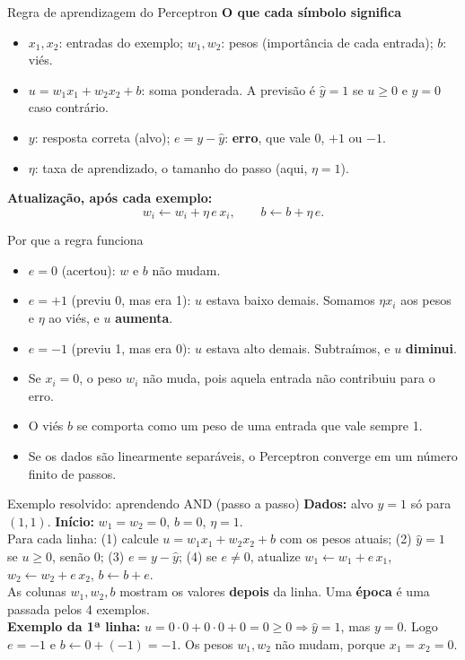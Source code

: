 \documentclass[10pt]{beamer}
\begin{document}
\begin{frame}{Regra de aprendizagem do Perceptron}
\textbf{O que cada símbolo significa}
\begin{itemize}
 \item $x_1,x_2$: entradas do exemplo; $w_1,w_2$: pesos (importância de cada entrada); $b$: viés.
 \item $u=w_1x_1+w_2x_2+b$: soma ponderada. A previsão é $\hat y=1$ se $u\ge0$ e $\hat y=0$ caso contrário.
 \item $y$: resposta correta (alvo); $e=y-\hat y$: \textbf{erro}, que vale $0$, $+1$ ou $-1$.
 \item $\eta$: taxa de aprendizado, o tamanho do passo (aqui, $\eta=1$).
\end{itemize}
\textbf{Atualização, após cada exemplo:}
\[ w_i \leftarrow w_i+\eta\,e\,x_i, \qquad b \leftarrow b+\eta\,e. \]
\end{frame}

\begin{frame}{Por que a regra funciona}
\begin{itemize}
 \item $e=0$ (acertou): $w$ e $b$ não mudam.
 \item $e=+1$ (previu 0, mas era 1): $u$ estava baixo demais. Somamos $\eta x_i$ aos pesos e $\eta$ ao viés, e $u$ \textbf{aumenta}.
 \item $e=-1$ (previu 1, mas era 0): $u$ estava alto demais. Subtraímos, e $u$ \textbf{diminui}.
 \item Se $x_i=0$, o peso $w_i$ não muda, pois aquela entrada não contribuiu para o erro.
 \item O viés $b$ se comporta como um peso de uma entrada que vale sempre 1.
 \item Se os dados são linearmente separáveis, o Perceptron converge em um número finito de passos.
\end{itemize}
\end{frame}

\begin{frame}{Exemplo resolvido: aprendendo AND (passo a passo)}
\small
\textbf{Dados:} alvo $y=1$ só para $(1,1)$. \textbf{Início:} $w_1=w_2=0$, $b=0$, $\eta=1$.\\[1mm]
Para cada linha: (1) calcule $u=w_1x_1+w_2x_2+b$ com os pesos atuais; (2) $\hat y=1$ se $u\ge0$, senão $0$; (3) $e=y-\hat y$; (4) se $e\ne0$, atualize $w_1\leftarrow w_1+e\,x_1$, $w_2\leftarrow w_2+e\,x_2$, $b\leftarrow b+e$.\\[1mm]
As colunas $w_1,w_2,b$ mostram os valores \textbf{depois} da linha. Uma \textbf{época} é uma passada pelos 4 exemplos.\\[1mm]
\textbf{Exemplo da 1ª linha:} $u=0\cdot0+0\cdot0+0=0\ge0\Rightarrow\hat y=1$, mas $y=0$. Logo $e=-1$ e $b\leftarrow0+(-1)=-1$. Os pesos $w_1,w_2$ não mudam, porque $x_1=x_2=0$.
\end{frame}
\end{document}
